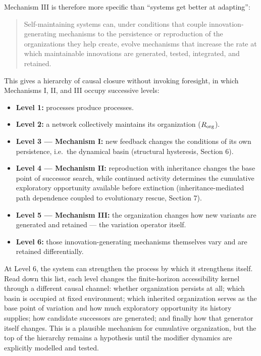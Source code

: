 \documentclass[11pt]{article}
\providecommand{\tightlist}{\setlength{\itemsep}{0pt}\setlength{\parskip}{0pt}}
\begin{document}
Mechanism III is therefore more specific than ``systems get better at
adapting'':

\begin{quote}
Self-maintaining systems can, under conditions that couple
innovation-generating mechanisms to the persistence or reproduction of
the organizations they help create, evolve mechanisms that increase the
rate at which maintainable innovations are generated, tested,
integrated, and retained.
\end{quote}

This gives a hierarchy of causal closure without invoking foresight, in
which Mechanisms I, II, and III occupy successive levels:

\begin{itemize}
\tightlist
\item
  \textbf{Level 1:} processes produce processes.
\item
  \textbf{Level 2:} a network collectively maintains its organization
  (\(R_{\rm org}\)).
\item
  \textbf{Level 3 --- Mechanism I:} new feedback changes the conditions
  of its own persistence, i.e.~the dynamical basin (structural
  hysteresis, Section 6).
\item
  \textbf{Level 4 --- Mechanism II:} reproduction with inheritance
  changes the base point of successor search, while continued activity
  determines the cumulative exploratory opportunity available before
  extinction (inheritance-mediated path dependence coupled to
  evolutionary rescue, Section 7).
\item
  \textbf{Level 5 --- Mechanism III:} the organization changes how new
  variants are generated and retained --- the variation operator itself.
\item
  \textbf{Level 6:} those innovation-generating mechanisms themselves
  vary and are retained differentially.
\end{itemize}

At Level 6, the system can strengthen the process by which it
strengthens itself. Read down this list, each level changes the
finite-horizon accessibility kernel through a different causal channel:
whether organization persists at all; which basin is occupied at fixed
environment; which inherited organization serves as the base point of
variation and how much exploratory opportunity its history supplies; how
candidate successors are generated; and finally how that generator
itself changes. This is a plausible mechanism for cumulative
organization, but the top of the hierarchy remains a hypothesis until
the modifier dynamics are explicitly modelled and tested.
\end{document}
